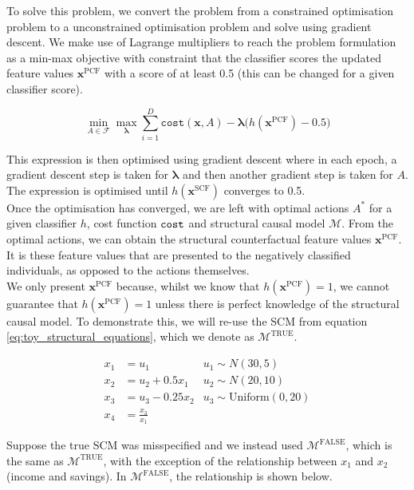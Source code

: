 To solve this problem, we convert the problem from a constrained optimisation problem to a unconstrained optimisation problem and solve using gradient descent. We make use of Lagrange multipliers to reach the problem formulation as a min-max objective with constraint that the classifier scores the updated feature values $\mathbf{x}^{\text{PCF}}$ with a score of at least 0.5 (this can be changed for a given classifier score).

\begin{equation} \label{eq:lagrange}
	\min_{A \in \mathcal{F}} \max_{\boldsymbol{\lambda}} \sum_{i=1}^D \texttt{cost}(\mathbf{x}, A) - \boldsymbol{\lambda} \bigg( h(\mathbf{x}^{\text{PCF}}) - 0.5\bigg)
\end{equation}

This expression is then optimised using gradient descent where in each epoch, a gradient descent step is taken for $\boldsymbol{\lambda}$ and then another gradient step is taken for $A$. The expression is optimised until $h(\mathbf{x}^{\text{SCF}})$ converges to 0.5.\\

Once the optimisation has converged, we are left with optimal actions $A^*$ for a given classifier $h$, cost function $\operatorname*{\texttt{cost}}$ and structural causal model $\mathcal{M}$. From the optimal actions, we can obtain the structural counterfactual feature values $\mathbf{x}^{\text{PCF}}$. It is these feature values that are presented to the negatively classified individuals, as opposed to the actions themselves.\\

We only present $\mathbf{x}^{\text{PCF}}$ because, whilst we know that $h(\mathbf{x}^{\text{PCF}})=1$, we cannot guarantee that $h(\mathbf{x}^{\text{PCF}})=1$ 
unless there is perfect knowledge of the structural causal model. To demonstrate this, we will re-use the SCM from equation \ref{eq:toy_structural_equations}, which we denote as $\mathcal{M}^{\text{TRUE}}$.

\begin{align}
	x_1 & = u_1 & u_1 \sim N(30 , 5) \\ \nonumber %
	x_2 & = u_2 + 0.5x_1 & u_2 \sim N(20, 10) \\ \nonumber %
	x_3 & = u_3 - 0.25x_2 & u_3 \sim \text{Uniform}(0, 20) \\ \nonumber %
	x_4 & = \frac{x_3}{x_1} %
\end{align}

Suppose the true SCM was misspecified and we instead used $\mathcal{M}^{\text{FALSE}}$, which is the same as $\mathcal{M}^{\text{TRUE}}$, with the exception of the relationship between $x_1$ and $x_2$ (income and savings). In $\mathcal{M}^{\text{FALSE}}$, the relationship is shown below.


